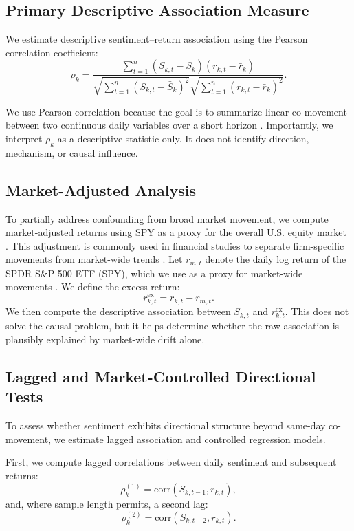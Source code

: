 \documentclass[lettersize,journal]{IEEEtran}
\begin{document}
\subsection{Primary Descriptive Association Measure}
We estimate descriptive sentiment--return association using the Pearson correlation coefficient:
\begin{equation}
\rho_k = \frac{\sum_{t=1}^{n}(S_{k,t}-\bar{S}_k)(r_{k,t}-\bar{r}_k)}{
\sqrt{\sum_{t=1}^{n}(S_{k,t}-\bar{S}_k)^2}\sqrt{\sum_{t=1}^{n}(r_{k,t}-\bar{r}_k)^2}}.
\label{eq:pearson_main2}
\end{equation}

We use Pearson correlation because the goal is to summarize linear co-movement between two continuous daily variables over a short horizon \cite{howell2021statistical}. Importantly, we interpret $\rho_k$ as a descriptive statistic only. It does not identify direction, mechanism, or causal influence.

\subsection{Market-Adjusted Analysis}

To partially address confounding from broad market movement, we compute market-adjusted returns using SPY as a proxy for the overall U.S. equity market \cite{sp500index}. This adjustment is commonly used in financial studies to separate firm-specific movements from market-wide trends \cite{campbell1997econometrics}.
Let $r_{m,t}$ denote the daily log return of the SPDR S\&P 500 ETF (SPY), which we use as a proxy for market-wide movements \cite{sp500index}. We define the excess return:
\begin{equation}
r^{\mathrm{ex}}_{k,t} = r_{k,t} - r_{m,t}.
\label{eq:excess_main2}
\end{equation}
We then compute the descriptive association between $S_{k,t}$ and $r^{\mathrm{ex}}_{k,t}$. This does not solve the causal problem, but it helps determine whether the raw association is plausibly explained by market-wide drift alone.

\subsection{Lagged and Market-Controlled Directional Tests}
To assess whether sentiment exhibits directional structure beyond same-day co-movement, we estimate lagged association and controlled regression models.

First, we compute lagged correlations between daily sentiment and subsequent returns:
\begin{equation}
\rho^{(1)}_k = \mathrm{corr}(S_{k,t-1}, r_{k,t}),
\end{equation}
and, where sample length permits, a second lag:
\begin{equation}
\rho^{(2)}_k = \mathrm{corr}(S_{k,t-2}, r_{k,t}).
\end{equation}
\end{document}
